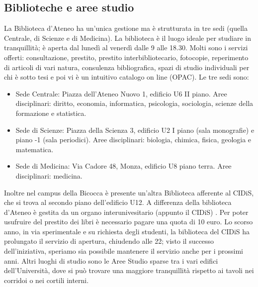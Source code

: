 \subsection{Biblioteche e aree studio}
La Biblioteca d'Ateneo ha un'unica gestione ma è strutturata in tre sedi (quella Centrale, di Scienze e di Medicina). La biblioteca è il luogo ideale per studiare in tranquillità; è aperta dal lunedì al venerdì dalle 9 alle 18.30. Molti sono i servizi offerti: consultazione, prestito, prestito interbibliotecario, fotocopie, reperimento di articoli di vari natura, consulenza bibliografica, spazi di studio individuali per chi è sotto tesi e poi vi è un intuitivo catalogo on line (OPAC). 
Le tre sedi sono:
\begin{itemize}
\item Sede Centrale: Piazza dell'Ateneo Nuovo 1, edificio U6 II piano. Aree disciplinari: diritto, economia, informatica, psicologia, sociologia, scienze della formazione e statistica. 
\item Sede di Scienze: Piazza della Scienza 3, edificio U2 I piano (sala monografie) e piano -1 (sala periodici). Aree disciplinari: biologia, chimica, fisica, geologia e matematica. 
\item Sede di Medicina: Via Cadore 48, Monza, edificio U8 piano terra. Aree disciplinari: medicina. 
\end{itemize}
Inoltre nel campus della Bicocca è presente un'altra Biblioteca afferente al CIDiS, che si trova al secondo piano dell'edificio U12. A differenza della biblioteca d'Ateneo è gestita da un organo interunivesitario (appunto il CIDiS) . Per poter usufruire del prestito dei libri è necessario pagare una quota di 10 euro. Lo scorso anno, in via sperimentale e su richiesta degli studenti, la biblioteca del CIDiS ha prolungato il servizio di apertura, chiudendo alle 22; visto il successo dell'iniziativa, speriamo sia possibile mantenere il servizio anche per i prossimi anni. 
Altri luoghi di studio sono le Aree Studio sparse tra i vari edifici dell'Università, dove si può trovare una maggiore tranquillità rispetto ai tavoli nei corridoi o nei cortili interni.

